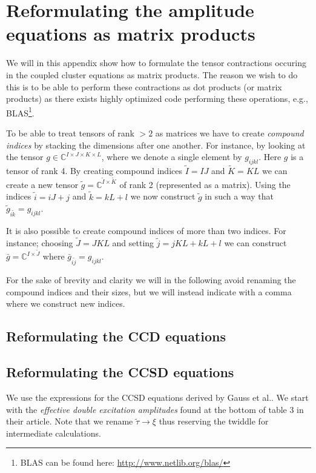 \chapter{Reformulating the amplitude equations as matrix products}
    \label{app:ccsd-dot-products}
    We will in this appendix show how to formulate the tensor contractions
    occuring in the coupled cluster equations as matrix products. The reason we
    wish to do this is to be able to perform these contractions as dot products
    (or matrix products) as there exists highly optimized code performing these
    operations, e.g., BLAS\footnote{BLAS can be found here:
    \url{http://www.netlib.org/blas/}}.

    To be able to treat tensors of rank $> 2$ as matrices we have to create
    \emph{compound indices} by stacking the dimensions after one another. For
    instance, by looking at the tensor $g \in \mathbb{C}^{I \times J \times K
    \times L}$, where we denote a single element by $g_{ijkl}$. Here $g$ is a
    tensor of rank 4. By creating compound indices $\tilde{I} = IJ$ and
    $\tilde{K} = KL$ we can create a new tensor $\tilde{g} =
    \mathbb{C}^{\tilde{I} \times \tilde{K}}$ of rank 2 (represented as a
    matrix). Using the indices $\tilde{i} = iJ + j$ and $\tilde{k} = kL + l$ we
    now construct $\tilde{g}$ in such a way that $\tilde{g}_{\tilde{i}\tilde{k}}
    = g_{ijkl}$.

    It is also possible to create compound indices of more than two indices. For
    instance; choosing $\tilde{J} = JKL$ and setting $\tilde{j} = jKL + kL + l$
    we can construct $\bar{g} = \mathbb{C}^{I\times \tilde{J}}$ where
    $\bar{g}_{i\tilde{j}} = g_{ijkl}$.

    For the sake of brevity and clarity we will in the following avoid renaming
    the compound indices and their sizes, but we will instead indicate with a
    comma where we construct new indices.

    \section{Reformulating the CCD equations}

    \section{Reformulating the CCSD equations}
        We use the expressions for the CCSD equations derived by Gauss et
        al.\cite{gauss1995coupled}. We start with the \emph{effective double
        excitation amplitudes} found at the bottom of table 3 in their article.
        Note that we rename $\tilde{\tau} \to \xi$ thus reserving the twiddle
        for intermediate calculations.

